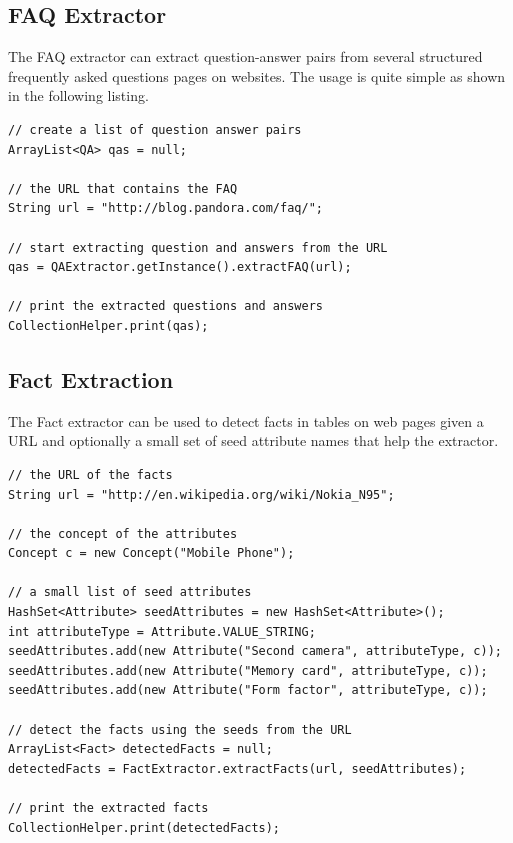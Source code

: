 \documentclass[a4paper,twoside]{article}      %
\begin{document}
\subsection{FAQ Extractor}
The FAQ extractor can extract question-answer pairs from several structured frequently asked questions pages on websites. The usage is quite simple as shown in the following listing.
\begin{codelisting}
\begin{lstlisting}[frame=tb]
// create a list of question answer pairs
ArrayList<QA> qas = null;

// the URL that contains the FAQ
String url = "http://blog.pandora.com/faq/";

// start extracting question and answers from the URL
qas = QAExtractor.getInstance().extractFAQ(url);

// print the extracted questions and answers
CollectionHelper.print(qas);
\end{lstlisting}
\end{codelisting}

\subsection{Fact Extraction}
The Fact extractor can be used to detect facts in tables on web pages given a URL and optionally a small set of seed attribute names that help the extractor.
\begin{codelisting}
\begin{lstlisting}[frame=tb]
// the URL of the facts
String url = "http://en.wikipedia.org/wiki/Nokia_N95";

// the concept of the attributes
Concept c = new Concept("Mobile Phone");

// a small list of seed attributes
HashSet<Attribute> seedAttributes = new HashSet<Attribute>();
int attributeType = Attribute.VALUE_STRING;
seedAttributes.add(new Attribute("Second camera", attributeType, c));
seedAttributes.add(new Attribute("Memory card", attributeType, c));
seedAttributes.add(new Attribute("Form factor", attributeType, c));

// detect the facts using the seeds from the URL
ArrayList<Fact> detectedFacts = null;
detectedFacts = FactExtractor.extractFacts(url, seedAttributes);
		
// print the extracted facts
CollectionHelper.print(detectedFacts);
\end{lstlisting}
\end{codelisting}
\end{document}
